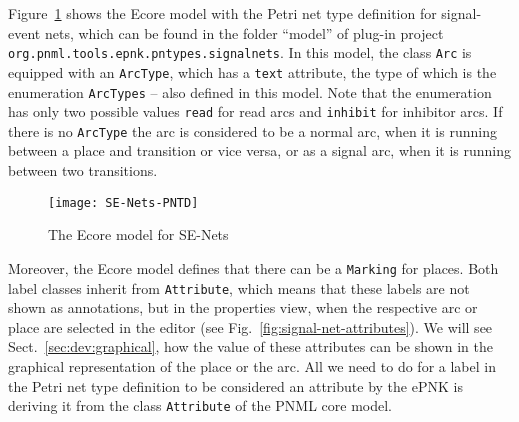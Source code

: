 Figure~\ref{fig:SE-Nets-PNTD} shows the Ecore model with the Petri net
type definition for signal-event nets, which can be found in the folder
``model'' of plug-in project {\tt org.pnml.tools.epnk.pntypes.signalnets}.
In this model, the class {\tt Arc} is equipped with an {\tt ArcType}, which
has a {\tt text} attribute, the type of which is the enumeration {\tt ArcTypes}
-- also defined in this model. Note
that the enumeration has only two possible values {\tt read} for read arcs
and {\tt inhibit} for inhibitor arcs. If there is no {\tt ArcType}
the arc is considered to be a normal arc, when it is running between
a place and transition or vice versa, or as a signal arc, when it
is running between two transitions. 
%
\begin{figure}[tbp!!]
  \centerline{\texttt{[image: SE-Nets-PNTD]}}
  \caption{The Ecore model for SE-Nets}
  \label{fig:SE-Nets-PNTD}
\end{figure}
%
Moreover, the Ecore model defines that there can be a {\tt Marking} for
places. Both label classes inherit from {\tt Attribute},%
which means that these labels are not shown as annotations, but in the
properties view, when the respective arc or place are selected in the editor (see
Fig.~\ref{fig:signal-net-attributes}). We will see
Sect.~\ref{sec:dev:graphical}, how the value of these attributes can
be shown in the graphical representation
of the place or the arc. All we need to do for a label in the Petri net
type definition to be considered an attribute by the ePNK is deriving it
from the class {\tt Attribute} of the PNML core model.

